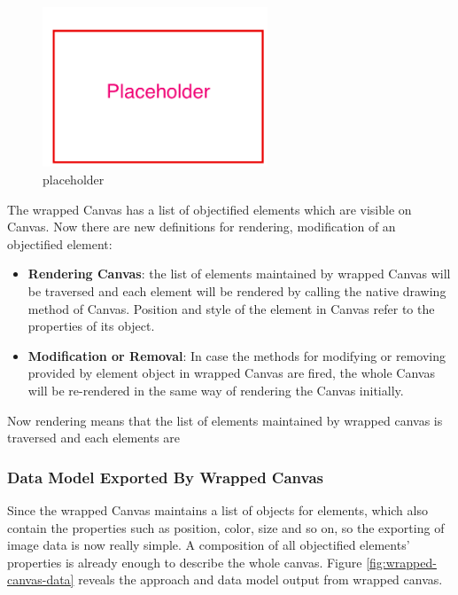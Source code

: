 \begin{figure}[!htbp]
  \centering
    \includegraphics[width=0.6\textwidth]{Figures/placeholder.png}
  \caption{placeholder}
  \label{fig:wrapped-canvas}
\end{figure}
The wrapped Canvas has a list of objectified elements which are visible on Canvas. Now there are new definitions for rendering, modification of an objectified element:
\begin{itemize}
\item
\textbf{Rendering Canvas}: the list of elements maintained by wrapped Canvas will be traversed and each element will be rendered by calling the native drawing method of Canvas. Position and style of the element in Canvas refer to the properties of its object.  
\item
\textbf{Modification or Removal}: In case the methods for modifying or removing provided by element object in wrapped Canvas are fired, the whole Canvas will be re-rendered in the same way of rendering the Canvas initially.

\end{itemize}
Now rendering means that the list of elements maintained by wrapped canvas is traversed and each elements are 

\subsubsection{Data Model Exported By Wrapped Canvas}
Since the wrapped Canvas maintains a list of objects for elements, which also contain the properties such as position, color, size and so on, so the exporting of image data is now really simple. A composition of all objectified elements' properties is already enough to describe the whole canvas. Figure \ref{fig:wrapped-canvas-data} reveals the approach and data model output from wrapped 
canvas.

